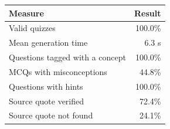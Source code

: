 \begin{tabular}{lr}
\toprule
Measure & Result \\
\midrule
Valid quizzes & 100.0\% \\
Mean generation time & 6.3 s \\
Questions tagged with a concept & 100.0\% \\
MCQs with misconceptions & 44.8\% \\
Questions with hints & 100.0\% \\
Source quote verified & 72.4\% \\
Source quote not found & 24.1\% \\
\bottomrule
\end{tabular}
